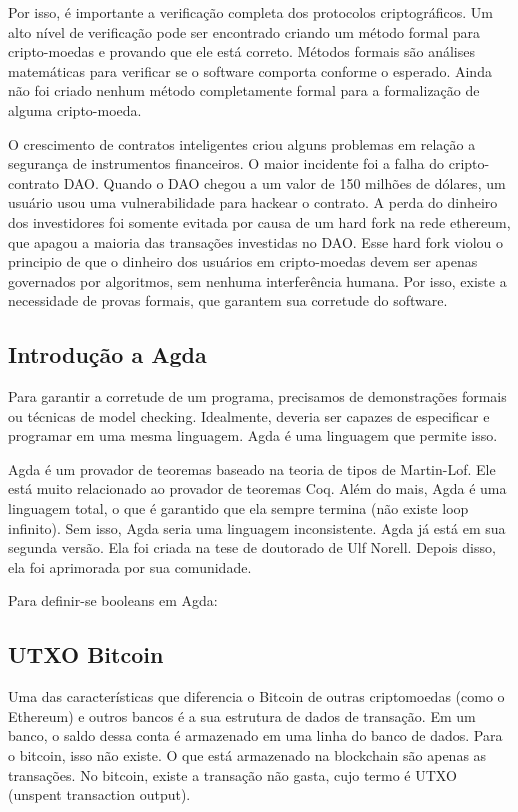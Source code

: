 \documentclass[12pt]{article}
\begin{document}
Por isso, é importante a verificação completa dos protocolos criptográficos.
Um alto nível de verificação pode ser encontrado criando um método formal para cripto-moedas e provando que ele está correto. Métodos formais são análises matemáticas para verificar se o software comporta conforme o esperado.
Ainda não foi criado nenhum método completamente formal para a formalização de alguma cripto-moeda.

O crescimento de contratos inteligentes criou alguns problemas em relação a segurança de instrumentos financeiros.
O maior incidente foi a falha do cripto-contrato DAO.
Quando o DAO chegou a um valor de 150 milhões de dólares, um usuário usou uma vulnerabilidade para hackear o contrato.
A perda do dinheiro dos investidores foi somente evitada por causa de um hard fork na rede ethereum,
que apagou a maioria das transações investidas no DAO.
Esse hard fork violou o principio de que o dinheiro dos usuários em cripto-moedas devem ser apenas governados por algoritmos,
sem nenhuma interferência humana.
Por isso, existe a necessidade de provas formais, que garantem sua corretude do software.

\subsection{Introdução a Agda}

Para garantir a corretude de um programa, precisamos de demonstrações formais ou técnicas de model checking.
Idealmente, deveria ser capazes de especificar e programar em uma mesma linguagem.
Agda  é uma linguagem que permite isso.

Agda é um provador de teoremas baseado na teoria de tipos de Martin-Lof.
Ele está muito relacionado ao provador de teoremas Coq.
Além do mais, Agda é uma linguagem total, o que é garantido que ela sempre termina (não existe loop infinito).
Sem isso, Agda seria uma linguagem inconsistente.
Agda já está em sua segunda versão.
Ela foi criada na tese de doutorado de Ulf Norell.
Depois disso, ela foi aprimorada por sua comunidade.

Para definir-se booleans em Agda:


\subsection{UTXO Bitcoin}

Uma das características que diferencia o Bitcoin de outras criptomoedas (como o Ethereum) e outros bancos é a sua estrutura de dados de transação. Em um banco, o saldo dessa conta é armazenado em uma linha do banco de dados. Para o bitcoin, isso não existe. O que está armazenado na blockchain são apenas as transações. No bitcoin, existe a transação não gasta, cujo termo é UTXO (unspent transaction output).
\end{document}
